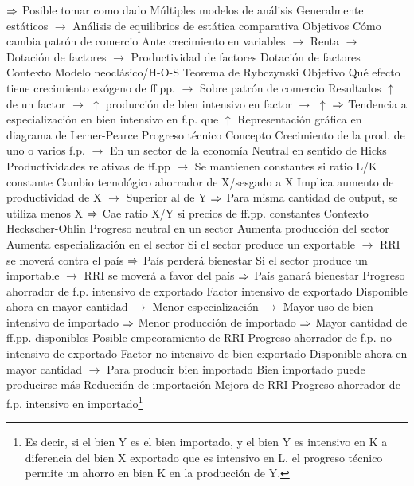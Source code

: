 \documentclass{nuevotema}
\begin{document}
\begin{esquemal}
				\4[] $\then$ Posible tomar como dado
				\4 Múltiples modelos de análisis
				\4[] Generalmente estáticos
				\4[] $\to$ Análisis de equilibrios de estática comparativa
			\3 Objetivos
				\4 Cómo cambia patrón de comercio
				\4[] Ante crecimiento en variables
				\4[] $\to$ Renta
				\4[] $\to$ Dotación de factores
				\4[] $\to$ Productividad de factores
		\2 Dotación de factores
			\3 Contexto
				\4[] Modelo neoclásico/H-O-S
				\4[] Teorema de Rybczynski
			\3 Objetivo
				\4[] Qué efecto tiene crecimiento exógeno de ff.pp.
				\4[] $\to$ Sobre patrón de comercio
			\3 Resultados
				\4[] $\uparrow$ de un factor
				\4[] $\to$ $\uparrow$ producción de bien intensivo en factor
				\4[] $\to$ $\uparrow$
				\4[] $\then$ Tendencia a especialización en bien intensivo en f.p. que $\uparrow$
				\4[] Representación gráfica en diagrama de Lerner-Pearce
				\4[] 
		\2 Progreso técnico
			\3 Concepto
				\4[] Crecimiento de la prod. de uno o varios f.p.
				\4[] $\to$ En un sector de la economía
				\4 Neutral en sentido de Hicks
				\4[] Productividades relativas de ff.pp
				\4[] $\to$ Se mantienen constantes si ratio L/K constante
				\4 Cambio tecnológico ahorrador de X/sesgado a X
				\4[] Implica aumento de productividad de X
				\4[] $\to$ Superior al de Y
				\4[] $\then$ Para misma cantidad de output, se utiliza menos X
				\4[] $\then$ Cae ratio X/Y si precios de ff.pp. constantes
				\4 Contexto Heckscher-Ohlin
			\3 Progreso neutral en un sector
				\4 Aumenta producción del sector
				\4[] Aumenta especialización en el sector
				\4 Si el sector produce un exportable
				\4[] $\to$ RRI se moverá contra el país
				\4[] $\then$ País perderá bienestar
				\4 Si el sector produce un importable
				\4[] $\to$ RRI se moverá a favor del país
				\4[] $\then$ País ganará bienestar
			\3 Progreso ahorrador de f.p. intensivo de exportado
				\4 Factor intensivo de exportado
				\4[] Disponible ahora en mayor cantidad
				\4[] $\to$ Menor especialización
				\4[] $\to$ Mayor uso de bien intensivo de importado
				\4[] $\then$ Menor producción de importado
				\4[] $\then$ Mayor cantidad de ff.pp. disponibles
				\4[$\then$] Posible empeoramiento de RRI
			\3 Progreso ahorrador de f.p. no intensivo de exportado
				\4 Factor no intensivo de bien exportado
				\4[] Disponible ahora en mayor cantidad
				\4[] $\to$ Para producir bien importado
				\4 Bien importado puede producirse más
				\4[] Reducción de importación
				\4[$\then$] Mejora de RRI
			\3 Progreso ahorrador de f.p. intensivo en importado\footnote{Es decir, si el bien Y es el bien importado, y el bien Y es intensivo en K a diferencia del bien X exportado que es intensivo en L, el progreso técnico permite un ahorro en bien K en la producción de Y.}

\end{esquemal}
\end{document}

